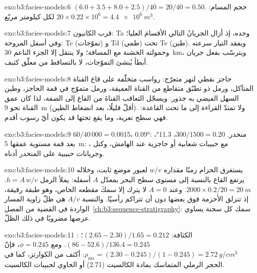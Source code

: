 \begin{solution}{exo:b3:facies-models:6}
$(6.0 + 3.5 + 8.0 + 2.5)/40 = 20/40 = 0.50$. حجم المسام: $20\times0.22
\times10^6 = \qty{4.4e6}{m^3}$ لكل كيلومتر مربّع.
\end{solution}

\begin{solution}{exo:b3:facies-models:7}
قرب الكانيون: Ta وحده، إذ أزال الجريانُ التالي الأقسامَ العليا؛ وفي
أسفل المروحة: Tc (تموّجات) و Td (طمي) تحت Te (طين). ويفقد التيار سرعته
وحمولته الخشنة مع المسافة؛ ولا ينتقل إلا الجزء الناعم
\qty{30}{km}، ويترسّب بفعل جريان أبطأ يُنشئ التموّجات، لا
بالتساقط من معلّق كثيف.
\end{solution}

\begin{solution}{exo:b3:facies-models:8}
حاجز نقطي لنهر متعرّج: رواسب متخلّفة على قاع القناة المتآكل،
ورمل ذو تطبّق متقاطع من القناة العميقة، ورمل متموّج في قمة الحاجز،
وطين السهل الفيضي به جذور. ويسجّل التعاقب القناةَ من القاع
إلى الضفة، لذا كان عمق القناة نحو \qty{9}{m} (أقلّ قليلًا، بعد
انضغاط الطين). ولا تمتدّ القراءة إلى ما تحت القاعدة: فهي سطح تعرية،
وما يقع تحتها قد يكون أيّ رسوب أقدم.
\end{solution}

\begin{solution}{exo:b3:facies-models:9}
$60/40\,000 = 0.0015$، \ang{0.09}: منحدر. $300/1500 = 0.20$، \ang{11.3}،
بعد قمة مستوية عمقها \qty{5}{m}: ، مع حبيبات شعابية أو حاجزية
عند الهامش، وكتل وجريانات حبيبية على المنحدر أدناه.
\end{solution}

\begin{solution}{exo:b3:facies-models:10}
يستغرق الحزام زمنًا مقداره $w/v$ لعبور موضع ثابت، وخلاله يرتفع القاع
بالنسبة إلى مستوى سطح البحر بمعدّل $A$ أسفله: يملأ الرمل $h = A\,w/v$.
$2000\times0.2/20 = \qty{20}{m}$. وعند $A = 0$ لا يترك  إلا
سمكَ مقطعه الخاص، وهو طبقة رقيقة، إذ تنزلق الأحزمة فوق بعضها
دون أن تتراكم رأسيًا. والنسبة $A/v$ هي ظلّ زاوية المسار
الواردة في القضية من الفصل~\ref{ch:b3:sequence-stratigraphy}: سمك كل
سحنة يساوي عرضها مضروبًا في ذلك الظلّ.
\end{solution}

\begin{solution}{exo:b3:facies-models:11}
الكثافة: $(2.65 - 2.30)/1.65 = 0.212$؛ : $(86 - 52.6)/136.4 = 0.245$.
ومع $\phi = 0.245$، فإنّ $\rho_{\mathrm{ma}} = (2.30 - 0.245)/(1 - 0.245) =
\qty{2.72}{g/cm^3}$: أكثف من الكوارتز، كما في الحجر الرملي المتماسك بمادة
الكالسيت (2.71) أو الحاوي لحبيبات الكالسيت.
\end{solution}

